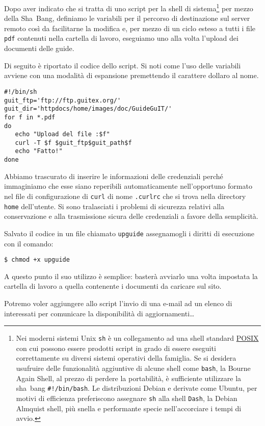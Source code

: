 Dopo aver indicato che si tratta di uno script per la shell di
sistema\footnote{Nei moderni sistemi Unix \texttt{sh} è un collegamento ad una
  shell standard \href{http://it.wikipedia.org/wiki/POSIX}{POSIX} con cui
  possono essere prodotti script in grado di essere eseguiti correttamente su
  diversi sistemi operativi della famiglia. Se si desidera usufruire delle
  funzionalità aggiuntive di alcune shell come \texttt{bash}, la Bourne Again
  Shell, al prezzo di perdere la portabilità, è sufficiente utilizzare la
  sha~bang \texttt{\#!/bin/bash}.  Le distribuzioni Debian e derivate come
  Ubuntu, per motivi di efficienza preferiscono assegnare \texttt{sh} alla
  shell \texttt{Dash}, la Debian Almquist shell, più snella e performante
  specie nell'accorciare i tempi di avvio.} per mezzo della Sha~Bang, definiamo
le variabili per il percorso di destinazione sul server remoto così da
facilitarne la modifica e, per mezzo di un ciclo esteso a tutti i file
\texttt{pdf} contenuti nella cartella di lavoro, eseguiamo uno alla volta
l'upload dei documenti delle guide.

Di seguito è riportato il codice dello script. Si noti come l'uso delle
variabili avviene con una modalità di espansione premettendo il carattere
dollaro al nome.
\begin{Verbatim}
#!/bin/sh
guit_ftp='ftp://ftp.guitex.org/'
guit_dir='httpdocs/home/images/doc/GuideGuIT/'
for f in *.pdf
do
   echo "Upload del file :$f"
   curl -T $f $guit_ftp$guit_path$f
   echo "Fatto!"
done
\end{Verbatim}

Abbiamo trascurato di inserire le informazioni delle credenziali perché
immaginiamo che esse siano reperibili automaticamente nell'opportuno formato
nel file di configurazione di \texttt{curl} di nome \texttt{.curlrc} che si
trova nella directory \texttt{home} dell'utente. Si sono tralasciati i
problemi di sicurezza relativi alla conservazione e alla trasmissione sicura
delle credenziali a favore della semplicità.

Salvato il codice in un file chiamato \texttt{upguide} assegnamogli i
diritti di esecuzione con il comando:
\begin{Verbatim}
$ chmod +x upguide
\end{Verbatim}
A questo punto il suo utilizzo è semplice: basterà avviarlo una volta impostata
la cartella di lavoro a quella contenente i documenti da caricare sul sito.

Potremo voler aggiungere allo script l'invio di una e-mail ad un elenco di
interessati per comunicare la disponibilità di aggiornamenti\dots

